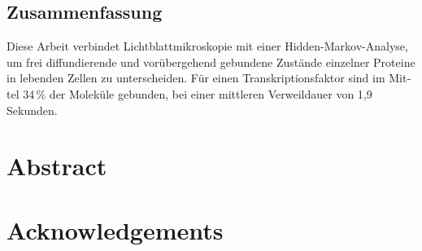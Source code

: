 \documentclass[11pt,oneside,a4paper]{report}
\begin{document}


\begin{otherlanguage}{ngerman}
\chapter*{Zusammenfassung}
Diese Arbeit verbindet Lichtblattmikroskopie mit einer Hidden-Markov-Analyse, um frei
diffundierende und vorübergehend gebundene Zustände einzelner Proteine in lebenden Zellen zu
unterscheiden. Für einen Transkriptionsfaktor sind im Mittel 34\,\% der Moleküle gebunden, bei
einer mittleren Verweildauer von 1{,}9 Sekunden.
\end{otherlanguage}
\clearpage
\chapter*{Abstract}

\clearpage
\tableofcontents
\listoffigures
\listoftables
\clearpage
{}






\appendix





\chapter*{Acknowledgements}

\end{document}
